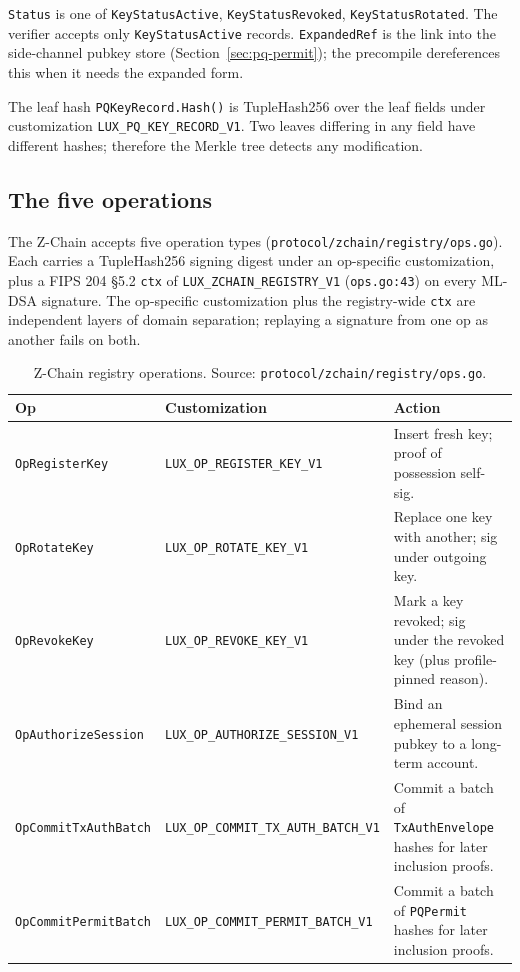 \texttt{Status} is one of \texttt{KeyStatusActive}, \texttt{KeyStatusRevoked},
\texttt{KeyStatusRotated}. The verifier accepts only \texttt{KeyStatusActive}
records. \texttt{ExpandedRef} is the link into the side-channel pubkey store
(Section~\ref{sec:pq-permit}); the precompile dereferences this when it
needs the expanded form.

The leaf hash \texttt{PQKeyRecord.Hash()} is TupleHash256 over the leaf
fields under customization \texttt{LUX\_PQ\_KEY\_RECORD\_V1}. Two leaves
differing in any field have different hashes; therefore the Merkle tree
detects any modification.

\subsection{The five operations}

The Z-Chain accepts five operation types
(\texttt{protocol/zchain/registry/ops.go}). Each carries a TupleHash256
signing digest under an op-specific customization, plus a FIPS 204 §5.2
\texttt{ctx} of \texttt{LUX\_ZCHAIN\_REGISTRY\_V1} (\texttt{ops.go:43}) on
every ML-DSA signature. The op-specific customization plus the registry-wide
\texttt{ctx} are independent layers of domain separation; replaying a
signature from one op as another fails on both.

\begin{table}[H]
\centering
\caption{Z-Chain registry operations. Source:
\texttt{protocol/zchain/registry/ops.go}.}
\label{tab:zchain-ops}
\begin{tabular}{llp{7cm}}
\toprule
Op & Customization & Action \\
\midrule
\texttt{OpRegisterKey}      & \texttt{LUX\_OP\_REGISTER\_KEY\_V1}      & Insert fresh key; proof of possession self-sig. \\
\texttt{OpRotateKey}        & \texttt{LUX\_OP\_ROTATE\_KEY\_V1}        & Replace one key with another; sig under outgoing key. \\
\texttt{OpRevokeKey}        & \texttt{LUX\_OP\_REVOKE\_KEY\_V1}        & Mark a key revoked; sig under the revoked key (plus profile-pinned reason). \\
\texttt{OpAuthorizeSession} & \texttt{LUX\_OP\_AUTHORIZE\_SESSION\_V1} & Bind an ephemeral session pubkey to a long-term account. \\
\texttt{OpCommitTxAuthBatch} & \texttt{LUX\_OP\_COMMIT\_TX\_AUTH\_BATCH\_V1} & Commit a batch of \texttt{TxAuthEnvelope} hashes for later inclusion proofs. \\
\texttt{OpCommitPermitBatch} & \texttt{LUX\_OP\_COMMIT\_PERMIT\_BATCH\_V1}   & Commit a batch of \texttt{PQPermit} hashes for later inclusion proofs. \\
\bottomrule
\end{tabular}
\end{table}

